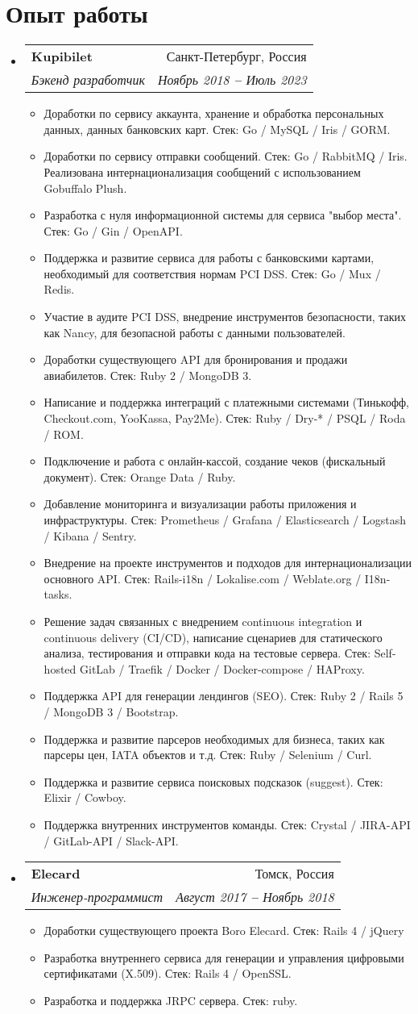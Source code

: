 \documentclass[letterpaper,11pt]{article}
\makeatletter
\newcommand{\resumeItem}[1]{
  \item\small{
    {#1 \vspace{-2pt}}
  }
}
\newcommand{\resumeSubheading}[4]{
  \vspace{-2pt}\item
    \begin{tabular*}{0.97\textwidth}[t]{l@{\extracolsep{\fill}}r}
      \textbf{#1} & #2 \\
      \textit{\small#3} & \textit{\small #4} \\
    \end{tabular*}\vspace{-7pt}
}
\newcommand{\resumeSubHeadingListStart}{\begin{itemize}[leftmargin=0.15in, label={}]}
\newcommand{\resumeSubHeadingListEnd}{\end{itemize}}
\newcommand{\resumeItemListStart}{\begin{itemize}}
\newcommand{\resumeItemListEnd}{\end{itemize}\vspace{-5pt}}
\makeatother
\begin{document}
\section{Опыт работы}
  \vspace{3pt}
  \resumeSubHeadingListStart
    \resumeSubheading
      {Kupibilet}{Санкт-Петербург, Россия}
      {Бэкенд разработчик}{Ноябрь 2018 \textbf{--} Июль 2023}
      \resumeItemListStart
          \resumeItem{Доработки по сервису аккаунта, хранение и обработка персональных данных, данных банковских карт. Стек: Go / MySQL / Iris / GORM.}
          \resumeItem{Доработки по сервису отправки сообщений. Стек: Go / RabbitMQ / Iris. Реализована интернационализация сообщений с использованием Gobuffalo Plush.}
          \resumeItem{Разработка с нуля информационной системы для сервиса "выбор места". Стек: Go / Gin / OpenAPI.}
          \resumeItem{Поддержка и развитие сервиса для работы с банковскими картами, необходимый для соответствия нормам PCI DSS. Стек: Go / Mux / Redis.}
          \resumeItem{Участие в аудите PCI DSS, внедрение инструментов безопасности, таких как Nancy, для безопасной работы с данными пользователей.}
          \resumeItem{Доработки существующего API для бронирования и продажи авиабилетов. Стек: Ruby 2 / MongoDB 3.}
          \resumeItem{Написание и поддержка интеграций с платежными системами (Тинькофф, Checkout.com, YooKassa, Pay2Me). Стек: Ruby / Dry-* / PSQL / Roda / ROM.}
          \resumeItem{Подключение и работа с онлайн-кассой, создание чеков (фискальный документ). Стек: Orange Data / Ruby.}
          \resumeItem{Добавление мониторинга и визуализации работы приложения и инфраструктуры. Стек: Prometheus / Grafana / Elasticsearch / Logstash / Kibana / Sentry.}
          \resumeItem{Внедрение на проекте инструментов и подходов для интернационализации основного API. Стек: Rails-i18n / Lokalise.com / Weblate.org / I18n-tasks.}
          \resumeItem{Решение задач связанных с внедрением continuous integration и continuous delivery (CI/CD), написание сценариев для статического анализа, тестирования и отправки кода на тестовые сервера. Стек: Self-hosted GitLab / Traefik / Docker / Docker-compose / HAProxy.}
          \resumeItem{Поддержка API для генерации лендингов (SEO). Стек: Ruby 2 / Rails 5 / MongoDB 3 / Bootstrap.}
          \resumeItem{Поддержка и развитие парсеров необходимых для бизнеса, таких как парсеры цен, IATA объектов и т.д. Стек: Ruby / Selenium / Curl.}
          \resumeItem{Поддержка и развитие сервиса поисковых подсказок (suggest). Стек: Elixir / Cowboy.}
          \resumeItem{Поддержка внутренних инструментов команды. Стек: Crystal / JIRA-API / GitLab-API / Slack-API.}
        \resumeItemListEnd
    \resumeSubheading
      {Elecard}{Томск, Россия}
      {Инженер-программист}{Август 2017 \textbf{--} Ноябрь 2018}
        \resumeItemListStart
          \resumeItem{Доработки существующего проекта Boro Elecard. Стек: Rails 4 / jQuery}
          \resumeItem{Разработка внутреннего сервиса для генерации и управления цифровыми сертификатами (X.509). Стек: Rails 4 / OpenSSL.}
          \resumeItem{Разработка и поддержка JRPC сервера. Стек: ruby.}
        \resumeItemListEnd
  \resumeSubHeadingListEnd
\end{document}
